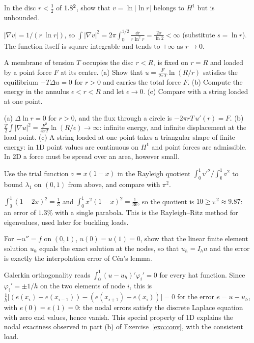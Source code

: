 \label{exo:sp-loglog}
In the disc $r<\tfrac12$ of $1.8^2$, show that $v=\ln|\ln r|$ belongs to $H^1$
but is unbounded.
\begin{solution}
$|\nabla v|=1/(r|\ln r|)$, so
$\displaystyle \int|\nabla v|^2=2\pi\int_0^{1/2}\frac{\dd r}{r\ln^2r}=\frac{2\pi}{\ln2}<\infty$
(substitute $s=\ln r$). The function itself is square integrable and tends to
$+\infty$ as $r\to0$.
\end{solution}

\label{exo:sp-point}
A membrane of tension $T$ occupies the disc $r<R$, is fixed on $r=R$ and
loaded by a point force $F$ at its centre. (a) Show that $\displaystyle u=\frac{F}{2\pi T}\ln(R/r)$
satisfies the equilibrium $-T\Delta u=0$ for $r>0$ and carries the total
force $F$. (b) Compute the energy in the annulus $\epsilon<r<R$ and let
$\epsilon\to0$. (c) Compare with a string loaded at one point.
\begin{solution}
(a) $\Delta\ln r=0$ for $r>0$, and the flux through a circle is
$-2\pi rT\,u'(r)=F$. (b) $\displaystyle \tfrac T2\int|\nabla u|^2=\frac{F^2}{4\pi T}\ln(R/\epsilon)\to\infty$:
infinite energy, and infinite displacement at the load point. (c) A string
loaded at one point takes a triangular shape of finite energy: in 1D point
values are continuous on $H^1$ and point forces are admissible. In 2D a
force must be spread over an area, however small.
\end{solution}

\label{exo:sp-rayleigh}
Use the trial function $v=x(1-x)$ in the Rayleigh quotient
$\displaystyle \int_0^1v'^2/\int_0^1v^2$ to bound $\lambda_1$ on $(0,1)$ from above, and
compare with $\pi^2$.
\begin{solution}
$\displaystyle \int_0^1(1-2x)^2=\tfrac13$ and $\displaystyle \int_0^1x^2(1-x)^2=\tfrac1{30}$, so the
quotient is $10\ge\pi^2\approx9.87$: an error of $1.3\%$ with a single
parabola. This is the Rayleigh--Ritz method for eigenvalues, used later for
buckling loads.
\end{solution}

\label{exo:sp-nodal}
For $-u''=f$ on $(0,1)$, $u(0)=u(1)=0$, show that the linear finite element
solution $u_h$ equals the exact solution at the nodes, so that $u_h=I_hu$
and the error is exactly the interpolation error of C\'ea's lemma.
\begin{solution}
Galerkin orthogonality reads $\displaystyle \int_0^1(u-u_h)'\varphi_i'=0$ for every hat
function. Since $\varphi_i'=\pm1/h$ on the two elements of node $i$, this is
$\displaystyle \frac1h\bigl[(e(x_i)-e(x_{i-1}))-(e(x_{i+1})-e(x_i))\bigr]=0$ for the error
$e=u-u_h$, with $e(0)=e(1)=0$: the nodal errors satisfy the discrete Laplace
equation with zero end values, hence vanish. This special property of 1D
explains the nodal exactness observed in part (b) of Exercise~\ref{exo:conv}, with the consistent load.
\end{solution}

